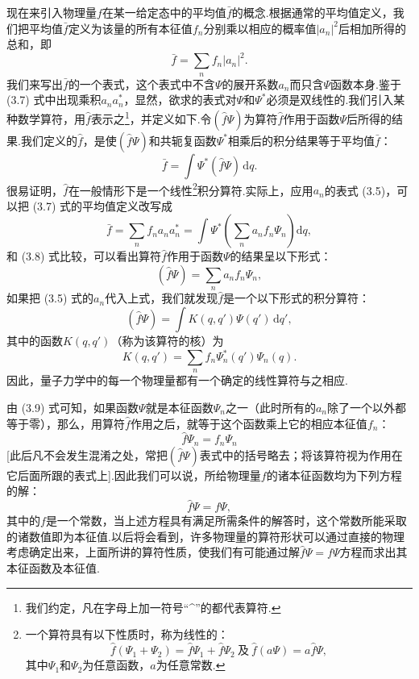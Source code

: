 现在来引入物理量$f$在某一给定态中的平均值$\bar{f}$的概念.根据通常的平均值定义，我们把平均值$\bar{f}$定义为该量的所有本征值$f_n$分别乘以相应的概率值$|a_n|^2$后相加所得的总和，即
\begin{equation}
  \bar{f}=\sum_n f_n|a_n|^2.
\end{equation}
我们来写出$\bar{f}$的一个表式，这个表式中不含$\varPsi$的展开系数$a_n$而只含$\varPsi$函数本身.鉴于 (3.7) 式中出现乘积$a_na_n^{*}$，显然，欲求的表式对$\varPsi$和$\varPsi^{*}$必须是双线性的.我们引入某种数学算符，用$\hat{f}$表示之\footnote{我们约定，凡在字母上加一符号“\textasciicircum{}”的都代表算符.}，并定义如下.令$(\hat{f}\varPsi)$为算符$\hat{f}$作用于函数$\varPsi$后所得的结果.我们定义的$\hat{f}$，是使$(\hat{f}\varPsi)$和共轭复函数$\varPsi^{*}$相乘后的积分结果等于平均值$\bar{f}$：
\begin{equation}
  \bar{f}=\int\varPsi^{*}(\hat{f}\varPsi)\,\mathrm{d}q.
\end{equation}
很易证明，$\hat{f}$在一般情形下是一个线性\footnote{一个算符具有以下性质时，称为线性的：
\begin{equation*}
  \hat{f}(\varPsi_1+\varPsi_2)=\hat{f}\varPsi_1+\hat{f}\varPsi_2
  \ \text{及}\ \hat{f}(a\varPsi)=a\hat{f}\varPsi,
\end{equation*}
其中$\varPsi_1$和$\varPsi_2$为任意函数，$a$为任意常数.}积分算符.实际上，应用$a_n$的表式 (3.5)，可以把 (3.7) 式的平均值定义改写成
\begin{equation*}
  \bar{f}=\sum_n f_na_na_n^{*}
  =\int\varPsi^{*}\left(\sum_n a_nf_n\varPsi_n\right)\mathrm{d}q,
\end{equation*}
和 (3.8) 式比较，可以看出算符$\hat{f}$作用于函数$\varPsi$的结果呈以下形式：
\begin{equation}
  (\hat{f}\varPsi)=\sum_n a_nf_n\varPsi_n,
\end{equation}
如果把 (3.5) 式的$a_n$代入上式，我们就发现$\hat{f}$是一个以下形式的积分算符：
\begin{equation}
  (\hat{f}\varPsi)=\int K(q,q')\varPsi(q')\,\mathrm{d}q',
\end{equation}
其中的函数$K(q,q')$（称为该算符的核）为
\begin{equation}
  K(q,q')=\sum_n f_n\varPsi_n^{*}(q')\varPsi_n(q).
\end{equation}
因此，量子力学中的每一个物理量都有一个确定的线性算符与之相应.

由 (3.9) 式可知，如果函数$\varPsi$就是本征函数$\varPsi_n$之一（此时所有的$a_n$除了一个以外都等于零），那么，用算符$\hat{f}$作用之后，就等于这个函数乘上它的相应本征值$f_n$：
\begin{equation}
  \hat{f}\varPsi_n=f_n\varPsi_n
\end{equation}
[此后凡不会发生混淆之处，常把$(\hat{f}\varPsi)$表式中的括号略去；将该算符视为作用在它后面所跟的表式上].因此我们可以说，所给物理量$f$的诸本征函数均为下列方程的解：
\begin{equation*}
  \hat{f}\varPsi=f\varPsi,
\end{equation*}
其中的$f$是一个常数，当上述方程具有满足所需条件的解答时，这个常数所能采取的诸数值即为本征值.以后将会看到，许多物理量的算符形状可以通过直接的物理考虑确定出来，上面所讲的算符性质，使我们有可能通过解$\hat{f}\varPsi=f\varPsi$方程而求出其本征函数及本征值.


